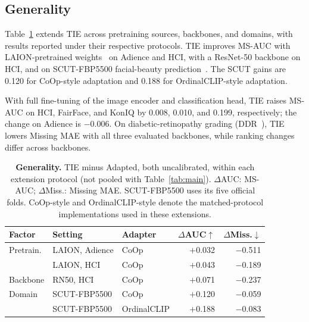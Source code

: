 \subsection{Generality}
\label{sec:exp_generality}

Table~\ref{tab:extensions} extends TIE across pretraining sources, backbones, and domains, with results reported under their respective protocols. TIE improves MS-AUC with LAION-pretrained weights~\cite{cherti2023reproducible} on Adience and HCI, with a ResNet-50 backbone on HCI, and on SCUT-FBP5500 facial-beauty prediction~\cite{liang2018scut}. The SCUT gains are 0.120 for CoOp-style adaptation and 0.188 for OrdinalCLIP-style adaptation.

With full fine-tuning of the image encoder and classification head, TIE raises MS-AUC on HCI, FairFace, and KonIQ by 0.008, 0.010, and 0.199, respectively; the change on Adience is $-0.006$. On diabetic-retinopathy grading (DDR~\cite{li2019ddr}), TIE lowers Missing MAE with all three evaluated backbones, while ranking changes differ across backbones.

\begin{table}[t]
\centering
\caption{\textbf{Generality.} TIE minus Adapted, both uncalibrated, within each extension protocol (not pooled with Table~\ref{tab:main}). $\Delta$AUC: MS-AUC; $\Delta$Miss.: Missing MAE. SCUT-FBP5500 uses its five official folds. CoOp-style and OrdinalCLIP-style denote the matched-protocol implementations used in these extensions.}
\label{tab:extensions}
\footnotesize
\setlength{\tabcolsep}{3pt}
\begin{tabular*}{\columnwidth}{@{\extracolsep{\fill}}lllrr@{}}
\toprule
Factor & Setting & Adapter & $\Delta$AUC$\uparrow$ & $\Delta$Miss.$\downarrow$ \\
\midrule
Pretrain. & LAION, Adience & CoOp & $+$0.032 & $-$0.511 \\
& LAION, HCI & CoOp & $+$0.043 & $-$0.189 \\
Backbone & RN50, HCI & CoOp & $+$0.071 & $-$0.237 \\
Domain & SCUT-FBP5500 & CoOp & $+$0.120 & $-$0.059 \\
& SCUT-FBP5500 & OrdinalCLIP & $+$0.188 & $-$0.083 \\
\bottomrule
\end{tabular*}
\end{table}

\setcounter{table}{5}
